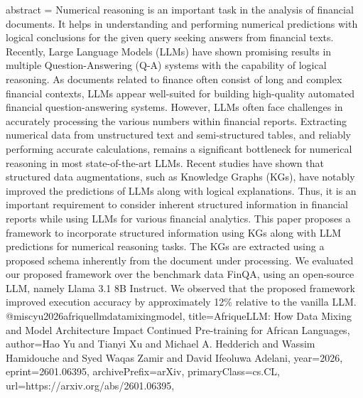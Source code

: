 {      abstract = {Numerical reasoning is an important task in the analysis of financial documents. It helps in understanding and performing numerical predictions with logical conclusions for the given query seeking answers from financial texts. Recently, Large Language Models (LLMs) have shown promising results in multiple Question-Answering (Q-A) systems with the capability of logical reasoning. As documents related to finance often consist of long and complex financial contexts, LLMs appear well-suited for building high-quality automated financial question-answering systems. However, LLMs often face challenges in accurately processing the various numbers within financial reports. Extracting numerical data from unstructured text and semi-structured tables, and reliably performing accurate calculations, remains a significant bottleneck for numerical reasoning in most state-of-the-art LLMs. Recent studies have shown that structured data augmentations, such as Knowledge Graphs (KGs), have notably improved the predictions of LLMs along with logical explanations. Thus, it is an important requirement to consider inherent structured information in financial reports while using LLMs for various financial analytics. This paper proposes a framework to incorporate structured information using KGs along with LLM predictions for numerical reasoning tasks. The KGs are extracted using a proposed schema inherently from the document under processing. We evaluated our proposed framework over the benchmark data FinQA, using an open-source LLM, namely Llama 3.1 8B Instruct. We observed that the proposed framework improved execution accuracy by approximately 12\% relative to the vanilla LLM.}
}@misc{yu2026afriquellmdatamixingmodel,
      title={AfriqueLLM: How Data Mixing and Model Architecture Impact Continued Pre-training for African Languages}, 
      author={Hao Yu and Tianyi Xu and Michael A. Hedderich and Wassim Hamidouche and Syed Waqas Zamir and David Ifeoluwa Adelani},
      year={2026},
      eprint={2601.06395},
      archivePrefix={arXiv},
      primaryClass={cs.CL},
      url={https://arxiv.org/abs/2601.06395},
}
